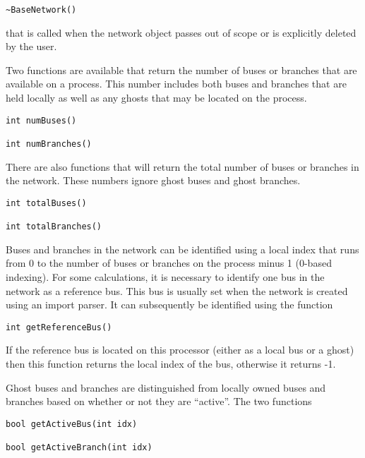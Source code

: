 {
\color{red}
\begin{Verbatim}[fontseries=b]
~BaseNetwork()
\end{Verbatim}
}

that is called when the network object passes out of scope or is explicitly deleted by the user.

Two functions are available that return the number of buses or branches that are available on a process. This number includes both buses and branches that are held locally as well as any ghosts that may be located on the process.

{
\color{red}
\begin{Verbatim}[fontseries=b]
int numBuses()

int numBranches()
\end{Verbatim}
}

There are also functions that will return the total number of buses or branches in the network. These numbers ignore ghost buses and ghost branches.

{
\color{red}
\begin{Verbatim}[fontseries=b]
int totalBuses()

int totalBranches()
\end{Verbatim}
}

Buses and branches in the network can be identified using a local index that runs from 0 to the number of buses or branches on the process minus 1 (0-based indexing). For some calculations, it is necessary to identify one bus in the network as a reference bus. This bus is usually set when the network is created using an import parser. It can subsequently be identified using the function

{
\color{red}
\begin{Verbatim}[fontseries=b]
int getReferenceBus()
\end{Verbatim}
}

If the reference bus is located on this processor (either as a local bus or a ghost) then this function returns the local index of the bus, otherwise it returns -1.

Ghost buses and branches are distinguished from locally owned buses and branches based on whether or not they are ``active''. The two functions

{
\color{red}
\begin{Verbatim}[fontseries=b]
bool getActiveBus(int idx)

bool getActiveBranch(int idx)
\end{Verbatim}
}

